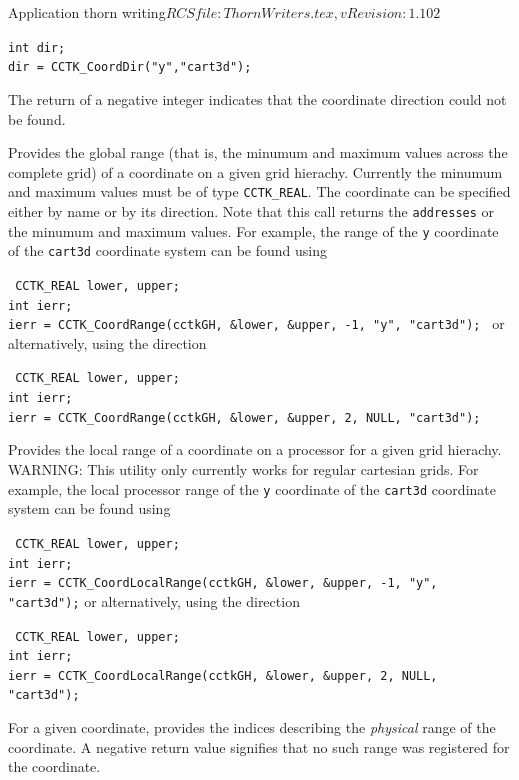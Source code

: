 \begin{cactuspart}{2}{Application thorn writing}{$RCSfile: ThornWriters.tex,v $}{$Revision: 1.102 $}
\begin{Lentry}
{\tt int dir;\\
dir = CCTK\_CoordDir("y","cart3d");
}

The return of a negative integer indicates that the coordinate direction
could not be found.

\item[{\tt CCTK\_CoordRange}]

Provides the global range (that is, the minumum and maximum values across
the complete grid) of a coordinate on a given grid hierachy. Currently
the minumum and maximum values must be of type {\tt CCTK\_REAL}. The
coordinate can be specified either by name or by its direction. Note that
this call returns the {\tt addresses} or the minumum and maximum values.
For example, the range of the {\tt y} coordinate of the {\tt cart3d}
coordinate system can be found using

{\tt
CCTK\_REAL lower, upper;\\
int ierr;\\
ierr = CCTK\_CoordRange(cctkGH, \&lower, \&upper, -1, "y", "cart3d");
}
or alternatively, using the direction

{\tt
CCTK\_REAL lower, upper;\\
int ierr;\\
ierr = CCTK\_CoordRange(cctkGH, \&lower, \&upper, 2, NULL, "cart3d");
}


\item[{\tt CCTK\_CoordLocalRange}]

Provides the local range of a coordinate on a processor for a given
grid hierachy. WARNING: This utility only currently works for regular
cartesian grids. For example, the local processor range of the
{\tt y} coordinate of the {\tt cart3d} coordinate system can be found using

{\tt
CCTK\_REAL lower, upper;\\
int ierr;\\
ierr = CCTK\_CoordLocalRange(cctkGH, \&lower, \&upper, -1, "y", "cart3d");}
or alternatively, using the direction

{\tt
CCTK\_REAL lower, upper;\\
int ierr;\\
ierr = CCTK\_CoordLocalRange(cctkGH, \&lower, \&upper, 2, NULL, "cart3d");
}

\item[{\tt CCTK\_CoordRangePhysIndex}]

For a given coordinate, provides the indices describing the {\it physical}
range of the coordinate. A negative return value signifies that no such range
was registered for the coordinate.


\end{Lentry}
\end{cactuspart}
